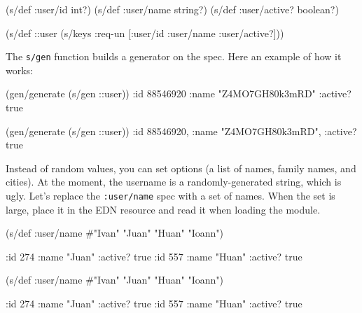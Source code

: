 \else

\begin{english}
  \begin{clojure}
(s/def :user/id int?)
(s/def :user/name string?)
(s/def :user/active? boolean?)

(s/def ::user (s/keys :req-un [:user/id
                               :user/name
                               :user/active?]))
  \end{clojure}
\end{english}

\fi

\noindent
The \verb|s/gen| function builds a generator on the spec. Here an example of how it works:

\ifnarrow

\begin{english}
  \begin{clojure}
(gen/generate (s/gen ::user))
{:id 88546920
 :name "Z4MO7GH80k3mRD"
 :active? true}
  \end{clojure}
\end{english}

\else

\begin{english}
  \begin{clojure}
(gen/generate (s/gen ::user))
{:id 88546920, :name "Z4MO7GH80k3mRD", :active? true}
  \end{clojure}
\end{english}

\fi

Instead of random values, you can set options (a list of names, family names, and cities). At the moment, the username is a randomly-generated string, which is ugly. Let's replace the \texttt{:user\-/name} spec with a set of names. When the set is large, place it in the EDN resource and read it when loading the module.

\ifnarrow

\begin{english}
  \begin{clojure}
(s/def :user/name
  #{"Ivan" "Juan" "Huan" "Ioann"})

{:id 274 :name "Juan" :active? true}
{:id 557 :name "Huan" :active? true}
  \end{clojure}
\end{english}

\else

\begin{english}
  \begin{clojure}
(s/def :user/name #{"Ivan" "Juan" "Huan" "Ioann"})

{:id 274 :name "Juan" :active? true}
{:id 557 :name "Huan" :active? true}
  \end{clojure}
\end{english}

